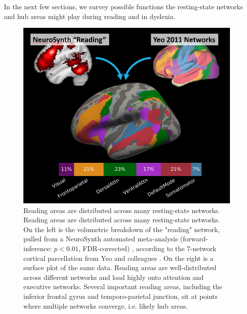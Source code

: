 In the next few sections, we survey possible functions the resting-state networks and hub areas might play during reading and in dyslexia.  

\begin{figure}
\centering
\includegraphics[width=5in]{images/ch1-yeo-to-neurosynth.png}
    \caption{Reading areas are distributed across many resting-state networks. Reading areas are distributed across many resting-state networks. On the left is the volumetric breakdown of the "reading" network, pulled from a NeuroSynth automated meta-analysis (forward-inference: $p < 0.01$, FDR-corrected) \cite{Yarkoni2011}, according to the 7-network cortical parcellation from Yeo and colleagues \cite{Yeo2011}. On the right is a surface plot of the same data. Reading areas are well-distributed across different networks and load highly onto attention and executive networks. Several important reading areas, including the inferior frontal gyrus and temporo-parietal junction, sit at points where multiple networks converge, i.e. likely hub areas.}
    \label{fig:ch1-yeo-to-neurosynth}
\end{figure}

